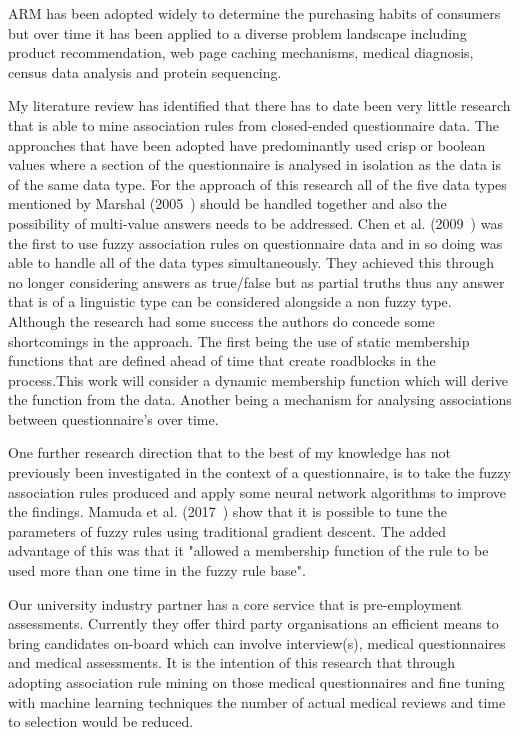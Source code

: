 ARM has been adopted widely to determine the purchasing habits of consumers but over time it has been applied to a diverse problem landscape including product recommendation, web page caching mechanisms, medical diagnosis, census data analysis and protein sequencing.

My literature review has identified that there has to date been very little research that is able to mine association rules from closed-ended questionnaire data. The approaches that have been adopted have predominantly used crisp or boolean values where a section of the questionnaire is analysed in isolation as the data is of the same data type. For the approach of this research all of the five data types mentioned by Marshal (2005~\cite{marshall2005purpose}) should be handled together and also the possibility of multi-value answers needs to be addressed. Chen et al. (2009~\cite{chen2009mining}) was the first to use fuzzy association rules on questionnaire data and in so doing was able to handle all of the data types simultaneously. They achieved this through no longer considering answers as true/false but as partial truths thus any answer that is of a linguistic type can be considered alongside a non fuzzy type. Although the research had some success the authors do concede some shortcomings in the approach. The first being the use of static membership functions that are defined ahead of time that create roadblocks in the process.This work will consider a dynamic membership function which will derive the function from the data. Another being a mechanism for analysing associations between questionnaire's over time.

One further research direction that to the best of my knowledge has not previously been investigated in the context of a questionnaire, is to take the fuzzy association rules produced and apply some neural network algorithms to improve the findings. Mamuda et al. (2017~\cite{mamuda2017fusion}) show that it is possible to tune the parameters of fuzzy rules using traditional gradient descent. The added advantage of this was that it "allowed a membership function of the rule to be used more than one time in the fuzzy rule base".


Our university industry partner has a core service that is pre-employment assessments. Currently they offer third party organisations an efficient means to bring candidates on-board which can involve interview(s), medical questionnaires and medical assessments. It is the intention of this research that through adopting association rule mining on those medical questionnaires and fine tuning with machine learning techniques the number of actual medical reviews and time to selection would be reduced.

